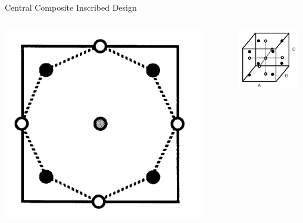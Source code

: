 \documentclass[14pt]{beamer}
\begin{document}
\begin{frame}{Central Composite Inscribed Design}

\begin{columns}
    \begin{column}{0.5\textwidth}
      \includegraphics[width=0.9\textwidth]{3level2factorCCI2.png}
    \end{column}
    \pause
    \begin{column}{0.5\textwidth}
      \includegraphics[width=0.9\textwidth]{3level3factorCCI2.png}
    \end{column}
  \end{columns}
\end{frame}
\end{document}
